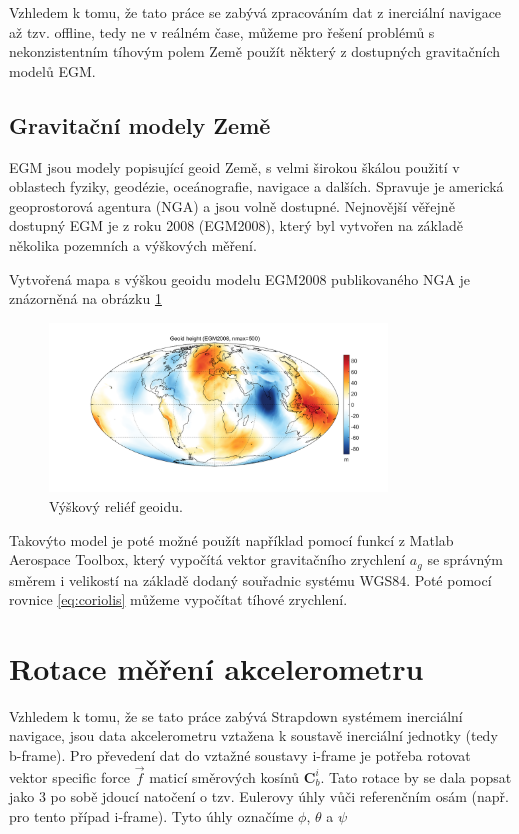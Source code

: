 Vzhledem k tomu, že tato práce se zabývá zpracováním dat z inerciální navigace až tzv. offline, tedy ne v reálném čase, můžeme pro řešení problémů s nekonzistentním tíhovým polem Země použít některý z dostupných gravitačních modelů EGM.

\subsection{Gravitační modely Země}
EGM jsou modely popisující geoid Země, s velmi širokou škálou použití v oblastech fyziky, geodézie, oceánografie, navigace a dalších. Spravuje je americká geoprostorová agentura (NGA) a jsou volně dostupné. Nejnovější věřejně dostupný EGM je z roku 2008 (EGM2008), který byl vytvořen na základě několika pozemních a výškových měření. \cite{Pavlis2012}

Vytvořená mapa s výškou geoidu modelu EGM2008 publikovaného NGA je znázorněná na obrázku \ref{fig:EGM2008}

\begin{figure}[h] \label{fig:EGM2008}
    \centering
    \includegraphics[width=0.8\textwidth]{obrazky/EGM2008}
    \caption{Výškový reliéf geoidu. \cite{Bezdek2013}}
\end{figure}

Takovýto model je poté možné použít například pomocí funkcí z Matlab Aerospace Toolbox, který vypočítá vektor gravitačního zrychlení $ a_{g} $ se správným směrem i velikostí na základě dodaný souřadnic systému WGS84. Poté pomocí rovnice \ref{eq:coriolis} můžeme vypočítat tíhové zrychlení.

\section{Rotace měření akcelerometru}
Vzhledem k tomu, že se tato práce zabývá Strapdown systémem inerciální navigace, jsou data akcelerometru vztažena k soustavě inerciální jednotky (tedy b-frame). Pro převedení dat do vztažné soustavy i-frame je potřeba rotovat vektor specific force $ \vec{f} $ maticí směrových kosínů $ \mathbf{C}_{b}^{i} $. Tato rotace by se dala popsat jako 3 po sobě jdoucí natočení o tzv. Eulerovy úhly vůči referenčním osám (např. pro tento případ i-frame). Tyto úhly označíme $ \phi $, $ \theta $ a $ \psi $ \cite{Tittertonc2004}

